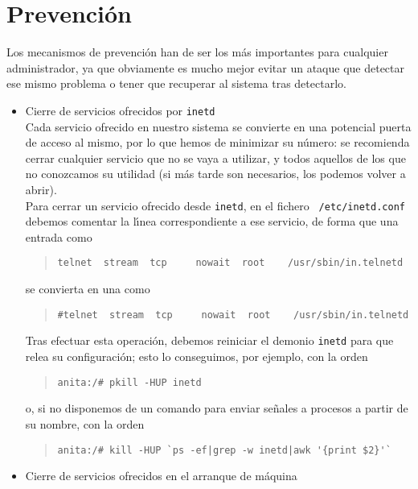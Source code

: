 \section{Prevenci\'on}
Los mecanismos de prevenci\'on han de ser los m\'as importantes para cualquier
administrador, ya que obviamente es mucho mejor evitar un ataque que detectar
ese mismo problema o tener que recuperar al sistema tras detectarlo.
\begin{itemize}
\item Cierre de servicios ofrecidos por {\tt inetd}\\
Cada servicio ofrecido en nuestro sistema se convierte en una potencial puerta
de acceso al mismo, por lo que hemos de minimizar su n\'umero: se recomienda 
cerrar cualquier servicio que no se vaya a utilizar, y todos aquellos de los 
que no conozcamos su utilidad (si m\'as tarde son necesarios, los podemos 
volver a abrir).\\ 
Para cerrar un servicio ofrecido desde {\tt inetd}, en el fichero {\tt 
/etc/inetd.conf} debemos comentar la l\'{\i}nea correspondiente a ese servicio,
de forma que una entrada como 
\tt
\begin{quote}
\begin{verbatim}
telnet  stream  tcp     nowait  root    /usr/sbin/in.telnetd
\end{verbatim}
\end{quote}
\rm
se convierta en una como 
\tt
\begin{quote}
\begin{verbatim}
#telnet  stream  tcp     nowait  root    /usr/sbin/in.telnetd
\end{verbatim}
\end{quote}
\rm
Tras efectuar esta operaci\'on, debemos reiniciar el demonio {\tt inetd} para
que relea su configuraci\'on; esto lo conseguimos, por ejemplo, con la orden
\tt
\begin{quote}
\begin{verbatim}
anita:/# pkill -HUP inetd
\end{verbatim}
\end{quote}
\rm
o, si no disponemos de un comando para enviar se\~nales a procesos a partir de
su nombre, con la orden
\tt
\begin{quote}
\begin{verbatim}
anita:/# kill -HUP `ps -ef|grep -w inetd|awk '{print $2}'`
\end{verbatim}
\end{quote}
\rm
\item Cierre de servicios ofrecidos en el arranque de m\'aquina\\

\end{itemize}
